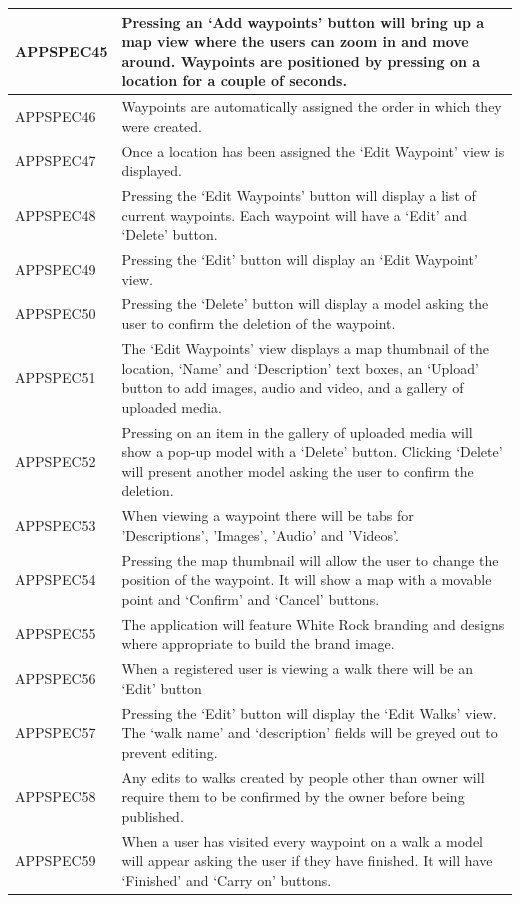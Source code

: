 \documentclass[11pt,a4paper]{article}
\begin{document}
\begin{longtable}{|p{2.5cm}p{13cm}|}
APPSPEC45 & Pressing an `Add waypoints' button will bring up a map view where the users can zoom in and move around. Waypoints are positioned by pressing on a location for a couple of seconds. \\ \hline
APPSPEC46 & Waypoints are automatically assigned the order in which they were created. \\ \hline
APPSPEC47 & Once a location has been assigned the `Edit Waypoint' view is displayed.\\ \hline
APPSPEC48 & Pressing the `Edit Waypoints' button will display a list of current waypoints. Each waypoint will have a `Edit' and `Delete' button. \\ \hline
APPSPEC49 & Pressing the `Edit' button will display an `Edit Waypoint' view. \\ \hline
APPSPEC50 & Pressing the `Delete' button will display a model asking the user to confirm the deletion of the waypoint. \\ \hline
APPSPEC51 & The `Edit Waypoints' view displays a map thumbnail of the location, `Name' and `Description' text boxes, an `Upload' button to add images, audio and video, and a gallery of uploaded media. \\ \hline
APPSPEC52 & Pressing on an item in the gallery of uploaded media will show a pop-up model with a `Delete' button. Clicking `Delete' will present another model asking the user to confirm the deletion. \\ \hline
APPSPEC53 & When viewing a waypoint there will be tabs for 'Descriptions', 'Images', 'Audio' and 'Videos'. \\ \hline
APPSPEC54 & Pressing the map thumbnail will allow the user to change the position of the waypoint. It will show a map with a movable point and `Confirm' and `Cancel' buttons. \\ \hline
APPSPEC55 & The application will feature White Rock branding and designs where appropriate to build the brand image. \\ \hline
APPSPEC56 & When a registered user is viewing a walk there will be an `Edit' button \\ \hline
APPSPEC57 & Pressing the `Edit' button will display the `Edit Walks' view. The `walk name' and `description' fields will be greyed out to prevent editing.\\ \hline
APPSPEC58 & Any edits to walks created by people other than owner will require them to be confirmed by the owner before being published. \\ \hline
APPSPEC59 & When a user has visited every waypoint on a walk a model will appear asking the user if they have finished. It will have `Finished' and `Carry on' buttons. \\ \hline

\end{longtable}
\end{document}
